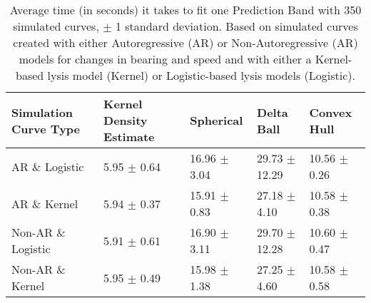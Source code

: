 \begin{table}[ht!]
\centering
\begin{tabular}{|R{1.2in}||L{.95in}L{.95in}|L{.9in}L{.9in}|}
  \hline
Simulation Curve Type & Kernel Density Estimate & Spherical & Delta Ball & Convex Hull \\ 
  \hline
AR \& Logistic & 5.95 \(\pm\) 0.64 & 16.96 \(\pm\) 3.04 & 29.73 \(\pm\) 12.29 & 10.56 \(\pm\) 0.26 \\ 
  AR \& Kernel & 5.94 \(\pm\) 0.37 & 15.91 \(\pm\) 0.83 & 27.18 \(\pm\) 4.10 & 10.58 \(\pm\) 0.38 \\ 
  Non-AR \& Logistic & 5.91 \(\pm\) 0.61 & 16.90 \(\pm\) 3.11 & 29.70 \(\pm\) 12.28 & 10.60 \(\pm\) 0.47 \\ 
  Non-AR \& Kernel & 5.95 \(\pm\) 0.49 & 15.98 \(\pm\) 1.38 & 27.25 \(\pm\) 4.60 & 10.58 \(\pm\) 0.58 \\ 
   \hline
\end{tabular}
\caption{Average time (in seconds) it takes to fit one Prediction Band with 350 simulated curves, \(\pm\) 1 standard deviation. Based on simulated curves created with either Autoregressive (AR) or Non-Autoregressive (AR) models for changes in bearing and speed and with either a Kernel-based lysis model (Kernel) or Logistic-based lysis models (Logistic).} 
\label{tab:time_fitting}
\end{table}
